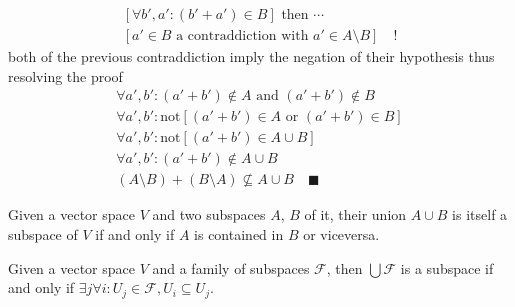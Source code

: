 \begin{multicols}{3}
\begin{minipage}{1.0\linewidth}
{\begin{equation}
        \begin{gathered}
          \left[\forall b', a' : (b' + a') \in B\right] \text{ then } \cdots \\
          \left[a' \in B \text{ a contraddiction with } a' \in A\setminus B\right] \quad !
        \end{gathered}
      \end{equation}
      both of the previous contraddiction imply the negation of their hypothesis thus
      resolving the proof
      \begin{equation}
        \begin{gathered}
          \forall a', b' : (a' + b') \not\in A \text{ and } (a' + b') \not\in B \\
          \forall a', b' : \text{not}\left[(a' + b') \in A \text{ or } (a' + b') \in B\right] \\
          \forall a', b' : \text{not}\left[(a' + b') \in A \cup B \right] \\
          \forall a', b' : (a' + b') \not\in A \cup B \\
          (A\setminus B) + (B\setminus A) \not\subseteq A \cup B \quad \blacksquare
        \end{gathered}
      \end{equation}
    }
  \end{minipage}

  Given a vector space $V$ and two subspaces $A$, $B$ of it,
  their union $A \cup B$ is itself a subspace of $V$
  if and only if $A$ is contained in $B$ or viceversa.
  \begin{minipage}{1.0\linewidth}
  \end{minipage}

  Given a vector space $V$ and a family of subspaces $\mathcal{F}$, then $\bigcup\mathcal{F}$ is
  a subspace if and only if $\exists j \forall i : U_j \in \mathcal{F}, U_i \subseteq U_j$.


\end{multicols}


